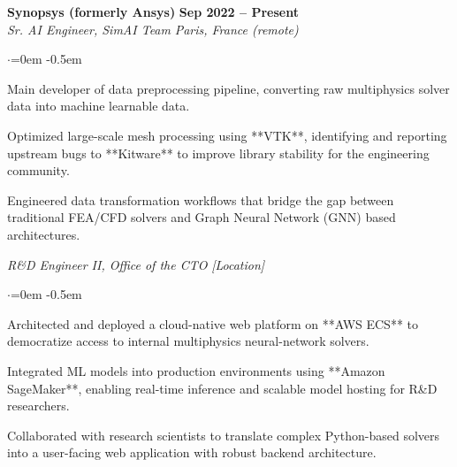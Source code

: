 {\bf Synopsys (formerly Ansys)} \hfill {\bf Sep 2022 -- Present} \\
{\em Sr. AI Engineer, SimAI Team} \hfill {\em Paris, France (remote)}
\begin{list}{$\cdot$}{\leftmargin=0em}
    \itemsep -0.5em \vspace{-0.5em}
    \item Main developer of data preprocessing pipeline, converting raw multiphysics solver data into machine learnable data.
    \item Optimized large-scale mesh processing using **VTK**, identifying and reporting upstream bugs to **Kitware** to improve library stability for the engineering community.
    \item Engineered data transformation workflows that bridge the gap between traditional FEA/CFD solvers and Graph Neural Network (GNN) based architectures.
\end{list}

\smallskip

{\em R\&D Engineer II, Office of the CTO} \hfill {\em [Location]}
\begin{list}{$\cdot$}{\leftmargin=0em}
    \itemsep -0.5em \vspace{-0.5em}
    \item Architected and deployed a cloud-native web platform on **AWS ECS** to democratize access to internal multiphysics neural-network solvers.
    \item Integrated ML models into production environments using **Amazon SageMaker**, enabling real-time inference and scalable model hosting for R\&D researchers.
    \item Collaborated with research scientists to translate complex Python-based solvers into a user-facing web application with robust backend architecture.
\end{list}